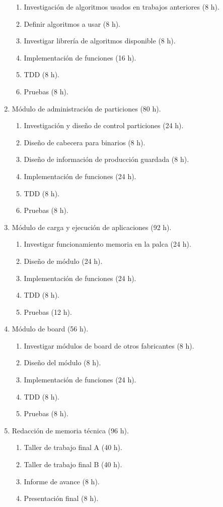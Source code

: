 \documentclass[
11pt, %
]{charter}
\begin{document}
\begin{enumerate}
	\begin{enumerate}
	\item Investigación de algoritmos usados en trabajos anteriores (8 h).
	\item Definir algoritmos a usar (8 h).
	\item Investigar librería de algoritmos disponible (8 h).
	\item Implementación de funciones (16 h).
	\item TDD (8 h).
	\item Pruebas (8 h).
	\end{enumerate}
\item Módulo de administración de particiones (80 h).
	\begin{enumerate}
	\item Investigación y diseño de control particiones (24 h).
	\item Diseño de cabecera para binarios (8 h).
	\item Diseño de información de producción guardada (8 h).
	\item Implementación de funciones (24 h).
	\item TDD  (8 h).
	\item Pruebas  (8 h).
	\end{enumerate}
\item Módulo de carga y ejecución de aplicaciones (92 h).
	\begin{enumerate}
	\item Investigar funcionamiento memoria en la palca (24 h).
	\item Diseño de módulo (24 h).
	\item Implementación de funciones (24 h).
	\item TDD (8 h).
	\item Pruebas (12 h).
	\end{enumerate}
\item Módulo de board (56 h).
	\begin{enumerate}
	\item Investigar módulos de board de otros fabricantes (8 h).
	\item Diseño del módulo (8 h).
	\item Implementación de funciones (24 h).
	\item TDD  (8 h).
	\item Pruebas  (8 h).
	\end{enumerate}
\item Redacción de memoria técnica (96 h).
	\begin{enumerate}
	\item Taller de trabajo final A (40 h).
	\item Taller de trabajo final B (40 h).
	\item Informe de avance  (8 h).
	\item Presentación final (8 h).
	\end{enumerate} 
\end{enumerate}
\end{document}
